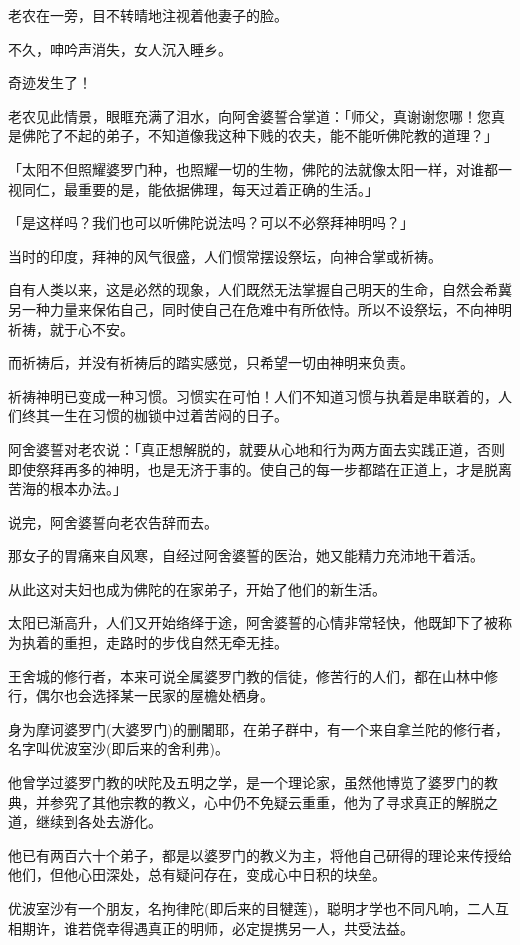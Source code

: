 \documentclass[12pt,twoside,openany]{book}
\begin{document}
老农在一旁，目不转晴地注视着他妻子的脸。

不久，呻吟声消失，女人沉入睡乡。

奇迹发生了！

老农见此情景，眼眶充满了泪水，向阿舍婆誓合掌道：「师父，真谢谢您哪！您真是佛陀了不起的弟子，不知道像我这种下贱的农夫，能不能听佛陀教的道理？」

「太阳不但照耀婆罗门种，也照耀一切的生物，佛陀的法就像太阳一样，对谁都一视同仁，最重要的是，能依据佛理，每天过着正确的生活。」

「是这样吗？我们也可以听佛陀说法吗？可以不必祭拜神明吗？」

当时的印度，拜神的风气很盛，人们惯常摆设祭坛，向神合掌或祈祷。

自有人类以来，这是必然的现象，人们既然无法掌握自己明天的生命，自然会希冀另一种力量来保佑自己，同时使自己在危难中有所依恃。所以不设祭坛，不向神明祈祷，就于心不安。

而祈祷后，并没有祈祷后的踏实感觉，只希望一切由神明来负责。

祈祷神明已变成一种习惯。习惯实在可怕！人们不知道习惯与执着是串联着的，人们终其一生在习惯的枷锁中过着苦闷的日子。

阿舍婆誓对老农说：「真正想解脱的，就要从心地和行为两方面去实践正道，否则即使祭拜再多的神明，也是无济于事的。使自己的每一步都踏在正道上，才是脱离苦海的根本办法。」

说完，阿舍婆誓向老农告辞而去。

那女子的胃痛来自风寒，自经过阿舍婆誓的医治，她又能精力充沛地干着活。

从此这对夫妇也成为佛陀的在家弟子，开始了他们的新生活。

太阳已渐高升，人们又开始络绎于途，阿舍婆誓的心情非常轻快，他既卸下了被称为执着的重担，走路时的步伐自然无牵无挂。

王舍城的修行者，本来可说全属婆罗门教的信徒，修苦行的人们，都在山林中修行，偶尔也会选择某一民家的屋檐处栖身。

身为摩诃婆罗门(大婆罗门)的删闍耶，在弟子群中，有一个来自拿兰陀的修行者，名字叫优波室沙(即后来的舍利弗)。

他曾学过婆罗门教的吠陀及五明之学，是一个理论家，虽然他博览了婆罗门的教典，并参究了其他宗教的教义，心中仍不免疑云重重，他为了寻求真正的解脱之道，继续到各处去游化。

他已有两百六十个弟子，都是以婆罗门的教义为主，将他自己研得的理论来传授给他们，但他心田深处，总有疑问存在，变成心中日积的块垒。

优波室沙有一个朋友，名拘律陀(即后来的目犍莲)，聪明才学也不同凡响，二人互相期许，谁若侥幸得遇真正的明师，必定提携另一人，共受法益。
\end{document}
